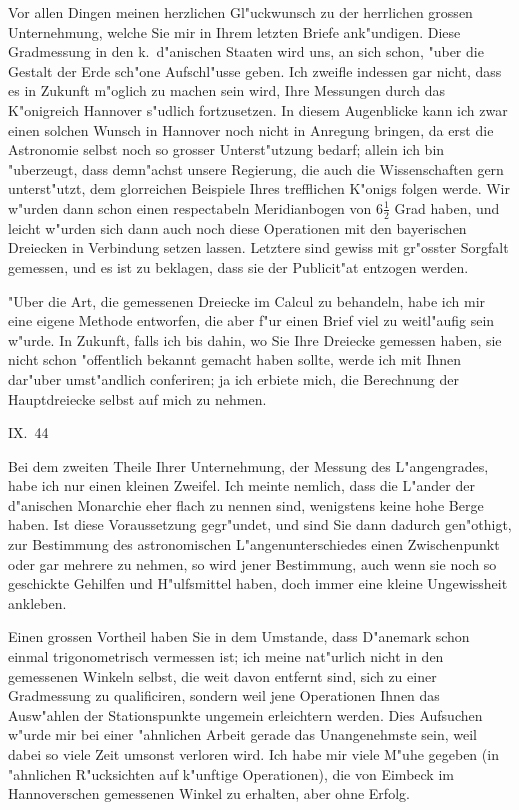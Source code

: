 \documentclass[12pt,a4paper]{article}
\theoremstyle{plain}
\theoremstyle{definition}
\theoremstyle{remark}
\begin{document}
\medskip
\noindent Vor allen Dingen meinen herzlichen Gl"uckwunsch zu der herrlichen grossen Unternehmung, welche Sie mir in Ihrem letzten Briefe ank"undigen. Diese Gradmessung in den k.\ d"anischen Staaten wird uns, an sich schon, "uber die Gestalt der Erde sch"one Aufschl"usse geben. Ich zweifle indessen gar nicht, dass es in Zukunft m"oglich zu machen sein wird, Ihre Messungen durch das K"onigreich Hannover s"udlich fortzusetzen. In diesem Augenblicke kann ich zwar einen solchen Wunsch in Hannover noch nicht in Anregung bringen, da erst die Astronomie selbst noch so grosser Unterst"utzung bedarf; allein ich bin "uberzeugt, dass demn"achst unsere Regierung, die auch die Wissenschaften gern unterst"utzt, dem glorreichen Beispiele Ihres trefflichen K"onigs folgen werde. Wir w"urden dann schon einen respectabeln Meridianbogen von $6\frac{1}{2}$ Grad haben, und leicht w"urden sich dann auch noch diese Operationen mit den bayerischen Dreiecken in Verbindung setzen lassen. Letztere sind gewiss mit gr"osster Sorgfalt gemessen, und es ist zu beklagen, dass sie der Publicit"at entzogen werden.

"Uber die Art, die gemessenen Dreiecke im Calcul zu behandeln, habe ich mir eine eigene Methode entworfen, die aber f"ur einen Brief viel zu weitl"aufig sein w"urde. In Zukunft, falls ich bis dahin, wo Sie Ihre Dreiecke gemessen haben, sie nicht schon "offentlich bekannt gemacht haben sollte, werde ich mit Ihnen dar"uber umst"andlich conferiren; ja ich erbiete mich, die Berechnung der Hauptdreiecke selbst auf mich zu nehmen.

\medskip
\noindent \textsc{IX.}~44

\newpage
\noindent Bei dem zweiten Theile Ihrer Unternehmung, der Messung des L"angengrades, habe ich nur einen kleinen Zweifel. Ich meinte nemlich, dass die L"ander der d"anischen Monarchie eher flach zu nennen sind, wenigstens keine hohe Berge haben. Ist diese Voraussetzung gegr"undet, und sind Sie dann dadurch gen"othigt, zur Bestimmung des astronomischen L"angenunterschiedes einen Zwischenpunkt oder gar mehrere zu nehmen, so wird jener Bestimmung, auch wenn sie noch so geschickte Gehilfen und H"ulfsmittel haben, doch immer eine kleine Ungewissheit ankleben.

Einen grossen Vortheil haben Sie in dem Umstande, dass D"anemark schon einmal trigonometrisch vermessen ist; ich meine nat"urlich nicht in den gemessenen Winkeln selbst, die weit davon entfernt sind, sich zu einer Gradmessung zu qualificiren, sondern weil jene Operationen Ihnen das Ausw"ahlen der Stationspunkte ungemein erleichtern werden. Dies Aufsuchen w"urde mir bei einer "ahnlichen Arbeit gerade das Unangenehmste sein, weil dabei so viele Zeit umsonst verloren wird. Ich habe mir viele M"uhe gegeben (in "ahnlichen R"ucksichten auf k"unftige Operationen), die von Eimbeck im Hannoverschen gemessenen Winkel zu erhalten, aber ohne Erfolg.
\end{document}
